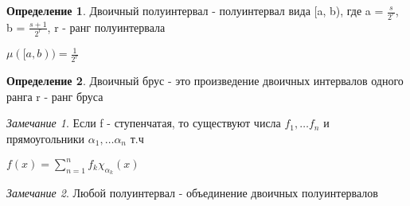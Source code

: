 \documentclass[a4paper]{article}
\theoremstyle{definition}
\newtheorem*{definition}{Определение}
\theoremstyle{remark}
\newtheorem*{remark}{Замечание}
\begin{document}
     \begin{definition}
          Двоичный полуинтервал - полуинтервал вида [a, b), где a = $\frac{s}{2^r}$, b = $\frac{s+1}{2^r}$, r - ранг полуинтервала

          $\mu([a,b)) = \frac{1}{2^r}$
     \end{definition}
     \begin{definition}
          Двоичный брус - это произведение двоичных интервалов одного ранга r - ранг бруса
     \end{definition}
     \begin{remark}
          Если f - ступенчатая, то существуют числа $f_1,\dots f_n$ и прямоугольники $\alpha_1, \dots\alpha_n$ т.ч

          $f(x) = \sum_{n=1}^n f_k \chi_{\alpha_k}(x)$
     \end{remark}
     \begin{remark}
          Любой полуинтервал - объединение двоичных полуинтервалов
     \end{remark}
\end{document}

